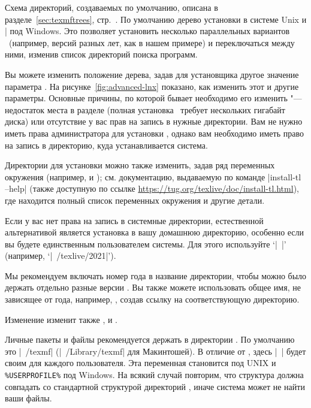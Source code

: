 \documentclass{article}
\def\p.{стр.~}%
\begin{document}
Схема директорий, создаваемых по умолчанию, описана в разделе~\ref{sec:texmftrees},
\p.\pageref{sec:texmftrees}.  По умолчанию дерево установки в системе
Unix  и |%
под Windows.  Это позволяет установить несколько параллельных
вариантов \TL\ (например, версий разных лет, как в нашем примере) и
переключаться между ними, изменив список директорий поиска программ.

Вы можете изменить положение дерева, задав для установщика другое
значение параметра .  На рисунке~\ref{fig:advanced-lnx}
показано, как изменить этот и другие параметры.  Основные причины, по
которой бывает необходимо его изменить "--- недостаток места в разделе
(полная установка \TL\ требует нескольких гигабайт диска) или
отсутствие у вас прав на запись в нужные директории.  Вам не нужно
иметь права администратора для установки \TL{}, однако вам необходимо
иметь право на запись в директорию, куда устанавливается система.

Директории для установки можно также изменить, задав ряд переменных
окружения (например,  и
); см. документацию, выдаваемую по
команде 
|install-tl --help| (также доступную по ссылке
\url{https://tug.org/texlive/doc/install-tl.html}), где находится
полный список переменных окружения и другие детали.


Если у вас нет права на запись в системные директории, естественной
альтернативой является установка в вашу домашнюю директорию, особенно
если вы будете единственным пользователем системы.  Для этого
используйте `|~|' (например, `|~/texlive/2021|').

Мы рекомендуем включать номер года в название директории, чтобы можно
было держать отдельно разные версии \TL{}.  Вы также можете
использовать общее имя, не зависящее от года, например,
, создав  ссылку на
соответствующую директорию.

Изменение  изменит также ,
 и .

Личные пакеты и файлы рекомендуется держать в директории
.  По умолчанию это |~/texmf| (|~/Library/texmf|
для Макинтошей).  В отличие от
, здесь |~| будет своим для каждого пользователя.
Эта переменная становится  под UNIX и                %
\verb|%USERPROFILE%| под Windows.  На всякий случай повторим, что 
структура  должна совпадать со стандартной
структурой директорий , иначе система может не найти
ваши файлы.
\end{document}
